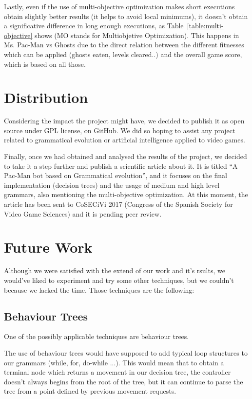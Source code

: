 Lastly, even if the use of multi-objective optimization makes short executions obtain slightly better results (it helps to avoid local minimums), it doesn't obtain a significative difference in long enough executions, as Table~\ref{table:multi-objective} shows (MO stands for Multiobjetive Optimization). This happens in Ms. Pac-Man vs Ghosts due to the direct relation between the different fitnesses which can be applied (ghosts eaten, levels cleared..) and the overall game score, which is based on all those.

\section{Distribution}
Considering the impact the project might have, we decided to publish it as open source under GPL \cite{licenseThesisGit} license, on GitHub. We did so hoping to assist any project related to grammatical evolution or artificial intelligence applied to video games. 

Finally, once we had obtained and analysed the results of the project, we decided to take it a step further and publish a scientific article about it. It is titled ``A Pac-Man bot based on Grammatical evolution'', and it focuses on the final implementation (decision trees) and the usage of medium and high level grammars, also mentioning the multi-objective optimization. At this moment, the article has been sent to CoSECiVi 2017 (Congress of the Spanish Society for Video Game Sciences) and it is pending peer review.

\section{Future Work}
Although we were satisfied with the extend of our work and it's rsults, we would've liked to experiment and try some other techniques, but we couldn't because we lacked the time. Those techniques are the following:

\subsection{Behaviour Trees}
One of the possibly applicable techniques are behaviour trees.

The use of behaviour trees would have supposed to add typical loop structures to our grammars (while, for, do-while ...). This would mean that to obtain a terminal node which returns a movement in our decision tree, the controller doesn't always begins from the root of the tree, but it can continue to parse the tree from a point defined by previous movement requests.

